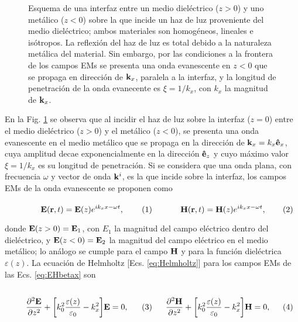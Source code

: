 \begin{figure}[h!]
	\caption{ Esquema de una interfaz entre un medio dieléctrico ($z>0$) y uno metálico ($z<0$) sobre la que incide un haz de luz proveniente del medio dieléctrico; ambos  materiales son homogéneos, lineales e isótropos. La reflexión del haz de luz es total debido a la naturaleza metálica del material. Sin embargo, por las condiciones a la frontera de los campos EMs se presenta una onda evanescente en $z<0$ que se propaga en dirección de $\vb{k}_x$, paralela a la interfaz, y la longitud de penetración de la onda evanecente es $\xi=1/k_x$, con $k_x$ la magnitud de $\vb{k}_x$. }\label{fig:SPP}
	\end{figure}
	
En la Fig. \ref{fig:SPP} se observa que al incidir el haz de luz sobre la interfaz ($z=0$)  entre el medio dieléctrico ($z>0$) y el metálico ($z<0$), se presenta una onda evanescente en el medio metálico que se propaga en la dirección de $\vb{k}_x=k_x\vu{e}_x$, cuya amplitud decae exponencialmente en la dirección $\vu{e}_z$ y cuyo máximo valor $\xi=1/k_x$ es su longitud de penetración. Si se considera que una onda plana, con frecuencia $\omega$ y vector de onda $\vb{k}^i$, es la que incide sobre la interfaz, los campos EMs de la onda evanescente se proponen como 

	\begin{subequations}\eqhalf{	\vb{E}(\vb{r},t) = \vb{E}(z)e^{ik_x x-\omega t },}
	\eqhalf{\vb{H}(\vb{r},t) = \vb{H}(z)e^{ik_x x-\omega t},}
	\label{eq:EHbetax}\end{subequations} \vspace*{-1em}
	
\noindent donde $\vb{E}(z>0)=\vb{E}_1$, con $E_1$ la magnitud del campo eléctrico dentro del dieléctrico, y $\vb{E}(z<0)=\vb{E}_2$ la magnitud del campo eléctrico en el medio metálico; lo análogo se cumple para el campo $\vb{H}$ y para la función dieléctrica $\varepsilon(z)$. La ecuación de Helmholtz [Ecs. \eqref{eq:Helmholtz}] para los campos EMs de las Ecs. \eqref{eq:EHbetax} son

	\begin{subequations}
	\eqhalf{	\pdv[2]{\vb{E}}{z} + \qty[k_0^2\frac{\varepsilon(z)}{\varepsilon_0} - k_x^2 ] \vb{E}= 0,\label{eq:helmE}}
	\eqhalf{\pdv[2]{\vb{H}}{z} + \qty[k_0^2\frac{\varepsilon(z)}{\varepsilon_0}  - k_x^2 ] \vb{H}= 0, \label{eq:helmH}}
	\end{subequations} 
	

